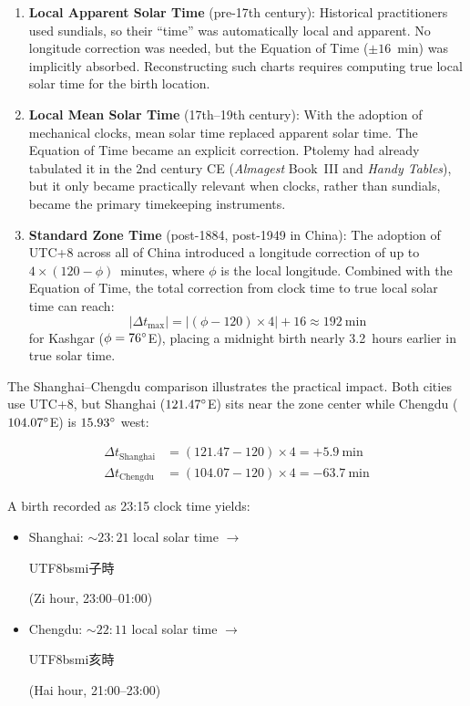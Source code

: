 \documentclass[10pt,a4paper]{article}
\newcommand{\zh}[1]{\begin{CJK}{UTF8}{bsmi}#1\end{CJK}}
\begin{document}
\begin{enumerate}
  \item \textbf{Local Apparent Solar Time} (pre-17th century):
    Historical practitioners used sundials, so their ``time'' was
    automatically local and apparent. No longitude correction was
    needed, but the Equation of Time ($\pm 16$~min) was implicitly
    absorbed. Reconstructing such charts requires computing true local
    solar time for the birth location.

  \item \textbf{Local Mean Solar Time} (17th--19th century):
    With the adoption of mechanical clocks, mean solar time replaced
    apparent solar time. The Equation of Time became an explicit
    correction. Ptolemy had already tabulated it in the 2nd century CE
    (\textit{Almagest} Book~III and \textit{Handy Tables}), but it only
    became practically relevant when clocks, rather than sundials,
    became the primary timekeeping instruments.

  \item \textbf{Standard Zone Time} (post-1884, post-1949 in China):
    The adoption of UTC+8 across all of China introduced a longitude
    correction of up to $4 \times (120 - \phi)$~minutes, where $\phi$
    is the local longitude. Combined with the Equation of Time, the
    total correction from clock time to true local solar time can reach:
    \[
      |\Delta t_{\max}| = |(\phi - 120) \times 4| + 16 \approx 192~\text{min}
    \]
    for Kashgar ($\phi = 76\degree$E), placing a midnight birth nearly
    3.2~hours earlier in true solar time.
\end{enumerate}

\noindent
The Shanghai--Chengdu comparison illustrates the practical impact.
Both cities use UTC+8, but Shanghai ($121.47\degree$E) sits near the
zone center while Chengdu ($104.07\degree$E) is $15.93\degree$ west:

\begin{align}
  \Delta t_{\text{Shanghai}} &= (121.47 - 120) \times 4 = +5.9~\text{min} \\
  \Delta t_{\text{Chengdu}}  &= (104.07 - 120) \times 4 = -63.7~\text{min}
\end{align}

\noindent
A birth recorded as 23:15 clock time yields:
\begin{itemize}[nosep]
  \item Shanghai: ${\sim}23{:}21$ local solar time $\to$ \zh{子時}
    (Zi hour, 23:00--01:00)
  \item Chengdu: ${\sim}22{:}11$ local solar time $\to$ \zh{亥時}
    (Hai hour, 21:00--23:00)
\end{itemize}
\end{document}
